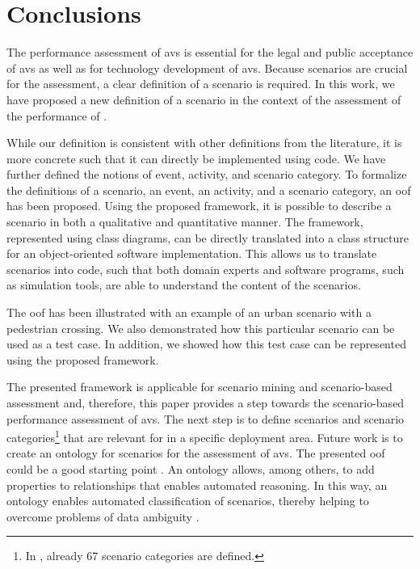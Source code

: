 \acresetall
\section{Conclusions}
\label{sec:conclusion}

The performance assessment of \acp{av} is essential for the legal and public acceptance of \acp{av} as well as for technology development of \acp{av}. 
Because scenarios are crucial for the assessment, a clear definition of a scenario is required.
In this work, we have proposed a new definition of a scenario in the context of the assessment of the performance of . 
 
While our definition is consistent with other definitions from the literature, it is more concrete such that it can directly be implemented using code.
We have further defined the notions of event, activity, and scenario category. 
To formalize the definitions of a scenario, an event, an activity, and a scenario category, an \cstartb \ac{oof} \cendb has been proposed. Using the proposed \cstartb framework\cendb, it is possible to describe a scenario in both a qualitative and quantitative manner. The \cstartb framework\cendb, represented using \cstartb class diagrams\cendb, can be directly translated into a class structure for an object-oriented software implementation. This allows us to translate scenarios into code, such that both domain experts and software programs, such as simulation tools, are able to understand the content of the scenarios. 

The \cstartb \ac{oof} \cendb has been illustrated with an example of an urban scenario with a pedestrian crossing. 
We also demonstrated how this particular scenario can be used as a test case. In addition, we showed how this test case can be represented using the proposed \cstartb framework\cendb.

The presented \cstartb framework \cendb is applicable for scenario mining \autocite{paardekooper2019dataset6000km, degelder2020scenariomining} and scenario-based assessment \autocite{elrofai2018scenario, putz2017pegasus} and, therefore, this paper provides a step towards the scenario-based performance assessment of \acp{av}. The next step is to define scenarios and scenario categories\footnote{In \autocite{degelder2019scenariocategories}, already 67 scenario categories are defined.} that are relevant for  in a specific deployment area. 
\cstartc Future work is to create an ontology for scenarios for the assessment of \acp{av}. The presented \ac{oof} could be a good starting point \autocite{siricharoen2009ontology}. An ontology allows, among others, to add properties to relationships that enables automated reasoning. In this way, an ontology enables automated classification of scenarios, thereby helping to overcome problems of data ambiguity \autocite{OpenSCENARIO2}. \cendc

